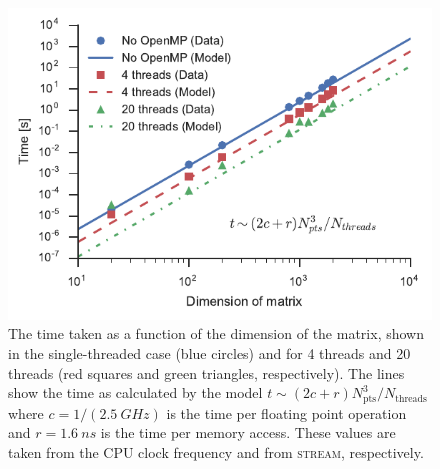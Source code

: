 \documentclass{article}
\begin{document}
\begin{figure}[p]
    \centering
    \includegraphics{dim_v_time.pdf}
    \caption{The time taken as a function of the dimension of the matrix, shown in the single-threaded case (blue circles) and for 4 threads and 20 threads (red squares and green triangles, respectively). The lines show the time as calculated by the model $t\sim(2c+r)N_\text{pts}^3/N_\text{threads}$ where $c=1 / (\SI{2.5}{GHz})$ is the time per floating point operation and $r = \SI{1.6}{ns}$ is the time per memory access. These values are taken from the CPU clock frequency and from \textsc{stream}, respectively.}
    \label{fig:dimvtime}
\end{figure}
\end{document}
